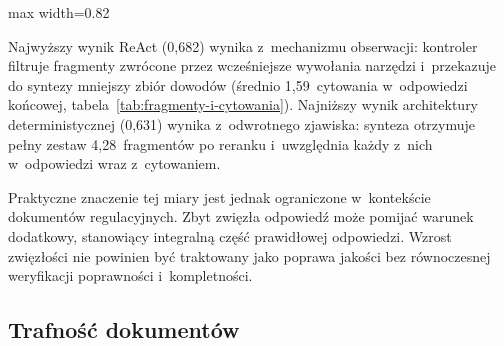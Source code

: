 \begin{wykres}[H]
  \caption{Zwięzłość według architektury}\label{wykres:zwiezlosc-per-architektura}
  \centering
  \begin{adjustbox}{max width=0.82\textwidth}
  \end{adjustbox}
\end{wykres}

Najwyższy wynik ReAct (0{,}682) wynika z~mechanizmu obserwacji: kontroler
filtruje fragmenty zwrócone przez wcześniejsze wywołania narzędzi i~przekazuje
do syntezy mniejszy zbiór dowodów (średnio 1{,}59~cytowania w~odpowiedzi
końcowej, tabela~\ref{tab:fragmenty-i-cytowania}). Najniższy wynik architektury
deterministycznej (0{,}631) wynika z~odwrotnego zjawiska: synteza otrzymuje
pełny zestaw 4{,}28~fragmentów po reranku i~uwzględnia każdy z~nich
w~odpowiedzi wraz z~cytowaniem.

Praktyczne znaczenie tej miary jest jednak ograniczone w~kontekście dokumentów
regulacyjnych. Zbyt zwięzła odpowiedź może pomijać warunek dodatkowy,
stanowiący integralną część prawidłowej odpowiedzi. Wzrost zwięzłości nie
powinien być traktowany jako poprawa jakości bez równoczesnej weryfikacji
poprawności i~kompletności.

\subsection{Trafność dokumentów}\label{subsec:trafnosc-dokumentow}

